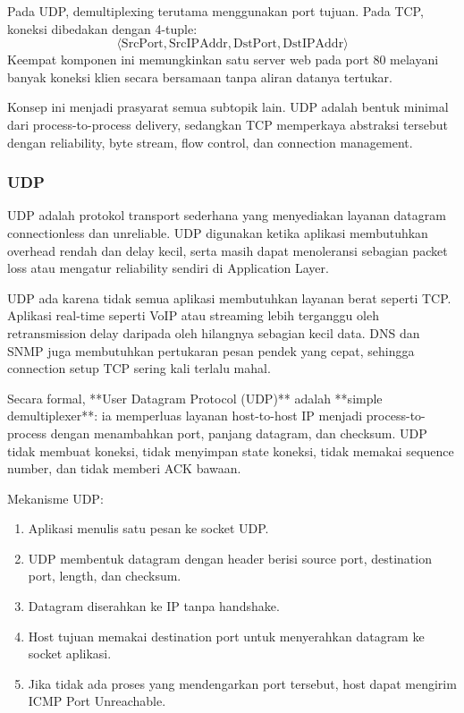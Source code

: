 Pada UDP, demultiplexing terutama menggunakan port tujuan. Pada TCP, koneksi dibedakan dengan 4-tuple:
\[
    \langle \text{SrcPort}, \text{SrcIPAddr}, \text{DstPort}, \text{DstIPAddr} \rangle
\]
Keempat komponen ini memungkinkan satu server web pada port 80 melayani banyak koneksi klien secara bersamaan tanpa aliran datanya tertukar.

Konsep ini menjadi prasyarat semua subtopik lain. UDP adalah bentuk minimal dari process-to-process delivery, sedangkan TCP memperkaya abstraksi tersebut dengan reliability, byte stream, flow control, dan connection management.

\subsubsection{UDP}
\begin{jawab}
UDP adalah protokol transport sederhana yang menyediakan layanan datagram connectionless dan unreliable. UDP digunakan ketika aplikasi membutuhkan overhead rendah dan delay kecil, serta masih dapat menoleransi sebagian packet loss atau mengatur reliability sendiri di Application Layer.
\end{jawab}

UDP ada karena tidak semua aplikasi membutuhkan layanan berat seperti TCP. Aplikasi real-time seperti VoIP atau streaming lebih terganggu oleh retransmission delay daripada oleh hilangnya sebagian kecil data. DNS dan SNMP juga membutuhkan pertukaran pesan pendek yang cepat, sehingga connection setup TCP sering kali terlalu mahal.

Secara formal, **User Datagram Protocol (UDP)** adalah **simple demultiplexer**: ia memperluas layanan host-to-host IP menjadi process-to-process dengan menambahkan port, panjang datagram, dan checksum. UDP tidak membuat koneksi, tidak menyimpan state koneksi, tidak memakai sequence number, dan tidak memberi ACK bawaan.

Mekanisme UDP:
\begin{enumerate}
    \item Aplikasi menulis satu pesan ke socket UDP.
    \item UDP membentuk datagram dengan header berisi source port, destination port, length, dan checksum.
    \item Datagram diserahkan ke IP tanpa handshake.
    \item Host tujuan memakai destination port untuk menyerahkan datagram ke socket aplikasi.
    \item Jika tidak ada proses yang mendengarkan port tersebut, host dapat mengirim ICMP Port Unreachable.
\end{enumerate}

